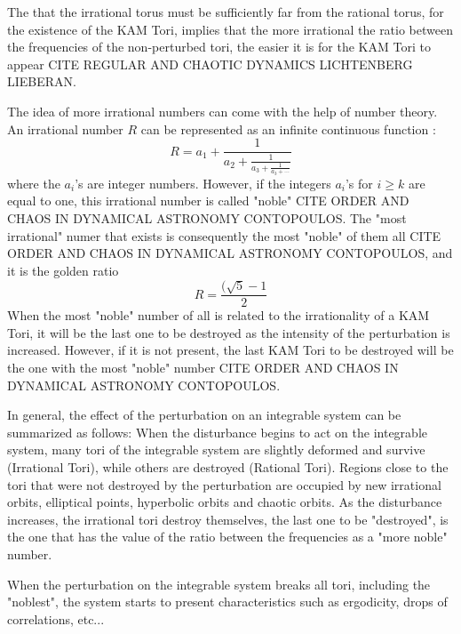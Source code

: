 The that the irrational torus must be sufficiently far from the rational torus, for the existence of the KAM Tori, implies that the more irrational the ratio between the frequencies of the non-perturbed tori, the easier it is for the KAM Tori to appear CITE REGULAR AND CHAOTIC DYNAMICS LICHTENBERG LIEBERAN.\par

The idea of more irrational numbers can come with the help of number theory. An irrational number $R$ can  be represented as an infinite continuous function \cite{ottChaosDynamicalSystems2002}:
\begin{equation}
R=a_1+\frac{1}{a_2+\frac{1}{a_3+\frac{1}{a_3+ \cdots}}}
\end{equation}
where the $a_i$'s are integer numbers. However, if the integers $a_i$'s for $i\geq k$ are equal to one, this irrational number is called "noble" CITE ORDER AND CHAOS IN DYNAMICAL ASTRONOMY CONTOPOULOS. The "most irrational" numer that exists is consequently the most "noble" of them all CITE ORDER AND CHAOS IN DYNAMICAL ASTRONOMY CONTOPOULOS, and it is the golden ratio
\begin{equation}
R=\frac{(\sqrt{5}-1}{2}
\end{equation}
When the most "noble" number of all is related to the irrationality of a KAM Tori, it will be the last one to be destroyed as the intensity of the perturbation is increased. However, if it is not present, the last KAM Tori to be destroyed will be the one with the most "noble" number CITE ORDER AND CHAOS IN DYNAMICAL ASTRONOMY CONTOPOULOS.\par

In general, the effect of the perturbation on an integrable system can be summarized as follows: When the disturbance begins to act on the integrable system, many tori of the integrable system are slightly deformed and survive (Irrational Tori), while others are destroyed (Rational Tori). Regions close to the tori that were not destroyed by the perturbation are occupied by new irrational orbits, elliptical points, hyperbolic orbits and chaotic orbits. As the disturbance increases, the irrational tori destroy themselves, the last one to be "destroyed", is the one that has the value of the ratio between the frequencies as a "more noble" number.\par

When the perturbation on the integrable system breaks all tori, including the "noblest", the system starts to present characteristics such as ergodicity, drops of correlations, etc...

